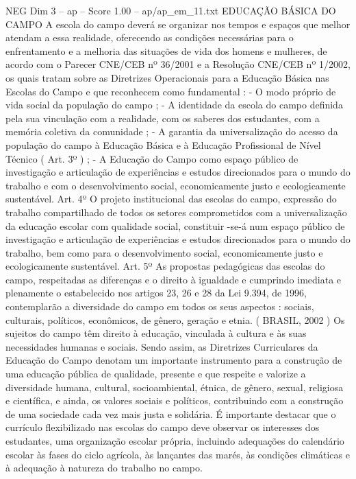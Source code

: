 \begin{textsample}{NEG Dim 3 – ap – Score 1.00 – ap/ap\_em\_11.txt}  \label{ex:f3_neg_106}
EDUCAÇÃO BÁSICA DO CAMPO A escola do campo deverá se organizar nos tempos e espaços que melhor atendam a essa realidade, oferecendo as condições necessárias para o enfrentamento e a melhoria das situações de vida dos homens e mulheres, de acordo com o Parecer CNE/CEB nº 36/2001 e a Resolução CNE/CEB nº 1/2002, os quais tratam sobre as Diretrizes Operacionais para a Educação Básica nas Escolas do Campo e que reconhecem como fundamental : - O modo próprio de vida social da população do campo ; - A identidade da escola do campo definida pela sua vinculação com a realidade, com os saberes dos estudantes, com a memória coletiva da comunidade ; - A garantia da universalização do acesso da população do campo à Educação Básica e à Educação Profissional de Nível Técnico ( Art. 3º ) ; - A Educação do Campo como espaço público de investigação e articulação de experiências e estudos direcionados para o mundo do trabalho e com o desenvolvimento social, economicamente justo e ecologicamente sustentável.
Art. 4º O projeto institucional das escolas do campo, expressão do trabalho compartilhado de todos os setores comprometidos com a universalização da educação escolar com qualidade social, constituir -se-á num espaço público de investigação e articulação de experiências e estudos direcionados para o mundo do trabalho, bem como para o desenvolvimento social, economicamente justo e ecologicamente sustentável.
Art. 5º As propostas pedagógicas das escolas do campo, respeitadas as diferenças e o direito à igualdade e cumprindo imediata e plenamente o estabelecido nos artigos 23, 26 e 28 da Lei 9.394, de 1996, contemplarão a diversidade do campo em todos os seus aspectos : sociais, culturais, políticos, econômicos, de gênero, geração e etnia. ( BRASIL, 2002 ) Os sujeitos do campo têm direito à educação, vinculada à cultura e às suas necessidades humanas e sociais.
Sendo assim, as Diretrizes Curriculares da Educação do Campo denotam um importante instrumento para a construção de uma educação pública de qualidade, presente e que respeite e valorize a diversidade humana, cultural, socioambiental, étnica, de gênero, sexual, religiosa e científica, e ainda, os valores sociais e políticos, contribuindo com a construção de uma sociedade cada vez mais justa e solidária.
É importante destacar que o currículo flexibilizado nas escolas do campo deve observar os interesses dos estudantes, uma organização escolar própria, incluindo adequações do calendário escolar às fases do ciclo agrícola, às lançantes das marés, às condições climáticas e à adequação à natureza do trabalho no campo.

\end{textsample}

